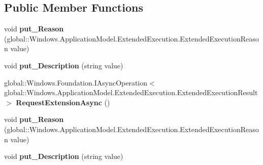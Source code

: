\subsection*{Public Member Functions}
\begin{DoxyCompactItemize}
\item 
\mbox{\label{interface_windows_1_1_application_model_1_1_extended_execution_1_1_i_extended_execution_session_a5ecf7f48efd35ce9815d586c085ee774}} 
void {\bfseries put\+\_\+\+Reason} (global\+::\+Windows.\+Application\+Model.\+Extended\+Execution.\+Extended\+Execution\+Reason value)
\item 
\mbox{\label{interface_windows_1_1_application_model_1_1_extended_execution_1_1_i_extended_execution_session_a5d1ffef5b854e7f9019b7b153c61fe91}} 
void {\bfseries put\+\_\+\+Description} (string value)
\item 
\mbox{\label{interface_windows_1_1_application_model_1_1_extended_execution_1_1_i_extended_execution_session_a3ae62e16eee49132e7dd5dd891a9c320}} 
global\+::\+Windows.\+Foundation.\+I\+Async\+Operation$<$ global\+::\+Windows.\+Application\+Model.\+Extended\+Execution.\+Extended\+Execution\+Result $>$ {\bfseries Request\+Extension\+Async} ()
\item 
\mbox{\label{interface_windows_1_1_application_model_1_1_extended_execution_1_1_i_extended_execution_session_a5ecf7f48efd35ce9815d586c085ee774}} 
void {\bfseries put\+\_\+\+Reason} (global\+::\+Windows.\+Application\+Model.\+Extended\+Execution.\+Extended\+Execution\+Reason value)
\item 
\mbox{\label{interface_windows_1_1_application_model_1_1_extended_execution_1_1_i_extended_execution_session_a5d1ffef5b854e7f9019b7b153c61fe91}} 
void {\bfseries put\+\_\+\+Description} (string value)
\item 
\mbox{\label{interface_windows_1_1_application_model_1_1_extended_execution_1_1_i_extended_execution_session_a3ae62e16eee49132e7dd5dd891a9c320}} 

\end{DoxyCompactItemize}
